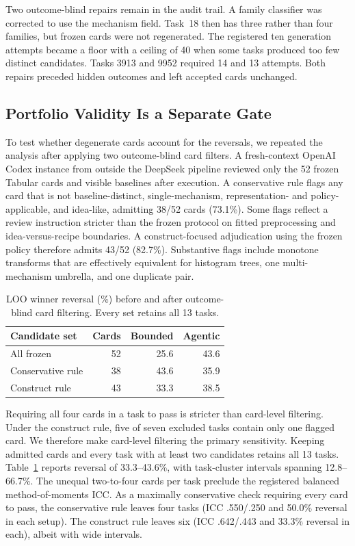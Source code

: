 \documentclass[letterpaper]{article}
\begin{document}
Two outcome-blind repairs remain in the audit trail. A family classifier was corrected to use the mechanism field. Task~18 then has three rather than four families, but frozen cards were not regenerated. The registered ten generation attempts became a floor with a ceiling of 40 when some tasks produced too few distinct candidates. Tasks 3913 and 9952 required 14 and 13 attempts. Both repairs preceded hidden outcomes and left accepted cards unchanged.

\subsection{Portfolio Validity Is a Separate Gate}
\label{sec:portfolio-validity}

To test whether degenerate cards account for the reversals, we repeated the analysis after applying two outcome-blind card filters. A fresh-context OpenAI Codex instance from outside the DeepSeek pipeline reviewed only the 52 frozen Tabular cards and visible baselines after execution. A conservative rule flags any card that is not baseline-distinct, \mbox{single-mechanism}, representation- and policy-applicable, and idea-like, admitting 38/52 cards (73.1\%). Some flags reflect a review instruction stricter than the frozen protocol on fitted preprocessing and idea-versus-recipe boundaries. A construct-focused adjudication using the frozen policy therefore admits 43/52 (82.7\%). Substantive flags include monotone transforms that are effectively equivalent for histogram trees, one multi-mechanism umbrella, and one duplicate pair.

\begin{table}[b]
\centering
\small
\setlength{\tabcolsep}{5pt}
\caption{LOO winner reversal (\%) before and after outcome-blind card filtering. Every set retains all 13 tasks.}
\label{tab:portfolio-sensitivity}
\begin{tabular}{lrrr}
\toprule
Candidate set & Cards & Bounded & Agentic \\
\midrule
All frozen & 52 & 25.6 & 43.6 \\
Conservative rule & 38 & 43.6 & 35.9 \\
Construct rule & 43 & 33.3 & 38.5 \\
\bottomrule
\end{tabular}
\end{table}

Requiring all four cards in a task to pass is stricter than card-level filtering. Under the construct rule, five of seven excluded tasks contain only one flagged card. We therefore make card-level filtering the primary sensitivity. Keeping admitted cards and every task with at least two candidates retains all 13 tasks. Table~\ref{tab:portfolio-sensitivity} reports reversal of 33.3--43.6\%, with task-cluster intervals spanning 12.8--66.7\%. The unequal two-to-four cards per task preclude the registered balanced method-of-moments ICC. As a maximally conservative check requiring every card to pass, the conservative rule leaves four tasks (ICC .550/.250 and 50.0\% reversal in each setup). The construct rule leaves six (ICC .642/.443 and 33.3\% reversal in each), albeit with wide intervals.
\end{document}
